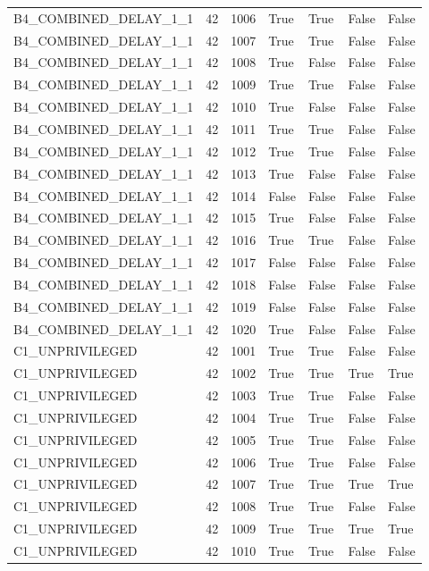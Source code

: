 \documentclass[11pt,a4paper,oneside]{book}
\begin{document}
\begin{longtable}{l l l l l l l}
B4\_COMBINED\_DELAY\_1\_1 & 42 & 1006 & True & True & False & False \\
B4\_COMBINED\_DELAY\_1\_1 & 42 & 1007 & True & True & False & False \\
B4\_COMBINED\_DELAY\_1\_1 & 42 & 1008 & True & False & False & False \\
B4\_COMBINED\_DELAY\_1\_1 & 42 & 1009 & True & True & False & False \\
B4\_COMBINED\_DELAY\_1\_1 & 42 & 1010 & True & False & False & False \\
B4\_COMBINED\_DELAY\_1\_1 & 42 & 1011 & True & True & False & False \\
B4\_COMBINED\_DELAY\_1\_1 & 42 & 1012 & True & True & False & False \\
B4\_COMBINED\_DELAY\_1\_1 & 42 & 1013 & True & False & False & False \\
B4\_COMBINED\_DELAY\_1\_1 & 42 & 1014 & False & False & False & False \\
B4\_COMBINED\_DELAY\_1\_1 & 42 & 1015 & True & False & False & False \\
B4\_COMBINED\_DELAY\_1\_1 & 42 & 1016 & True & True & False & False \\
B4\_COMBINED\_DELAY\_1\_1 & 42 & 1017 & False & False & False & False \\
B4\_COMBINED\_DELAY\_1\_1 & 42 & 1018 & False & False & False & False \\
B4\_COMBINED\_DELAY\_1\_1 & 42 & 1019 & False & False & False & False \\
B4\_COMBINED\_DELAY\_1\_1 & 42 & 1020 & True & False & False & False \\
C1\_UNPRIVILEGED & 42 & 1001 & True & True & False & False \\
C1\_UNPRIVILEGED & 42 & 1002 & True & True & True & True \\
C1\_UNPRIVILEGED & 42 & 1003 & True & True & False & False \\
C1\_UNPRIVILEGED & 42 & 1004 & True & True & False & False \\
C1\_UNPRIVILEGED & 42 & 1005 & True & True & False & False \\
C1\_UNPRIVILEGED & 42 & 1006 & True & True & False & False \\
C1\_UNPRIVILEGED & 42 & 1007 & True & True & True & True \\
C1\_UNPRIVILEGED & 42 & 1008 & True & True & False & False \\
C1\_UNPRIVILEGED & 42 & 1009 & True & True & True & True \\
C1\_UNPRIVILEGED & 42 & 1010 & True & True & False & False \\

\end{longtable}
\end{document}
